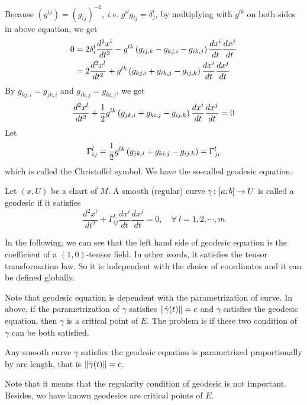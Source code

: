 Because $(g^{ij}) = (g_{ij})^{-1}$, \emph{i.e.} $g^{il}g_{lj} = \delta^i_j$, by multiplying with $g^{lk}$ on both sides in above equation, we get
\begin{equation*}
	\begin{aligned}
		0 &= 2\delta_i^l\frac{d^2x^i}{dt^2} - g^{lk}\left(g_{ij,k}-g_{kj,i}-g_{ik,j}\right)\frac{dx^i}{dt}\frac{dx^j}{dt} \\
		&=2\frac{d^2x^l}{dt^2}+g^{lk}\left(g_{kj,i} + g_{ik,j} - g_{ij,k}\right)\frac{dx^i}{dt}\frac{dx^j}{dt}
	\end{aligned}
\end{equation*}
By $g_{kj,i} = g_{jk,i}$ and $g_{ik,j} = g_{ki,j}$, we get
\begin{equation*}
	\frac{d^2x^l}{dt^2}+\frac{1}{2}g^{lk}\left(g_{jk,i} + g_{ki,j} - g_{ij,k}\right)\frac{dx^i}{dt}\frac{dx^j}{dt} = 0
\end{equation*}
Let
\begin{equation*}
	\Gamma_{ij}^l = \frac{1}{2}g^{lk}\left(g_{jk,i} + g_{ki,j} - g_{ij,k}\right) = \Gamma_{ji}^l
\end{equation*}
which is called the Christoffel symbol. We have the so-called geodesic equation.
\begin{defn}
	Let $(x,U)$ be a chart of $M$. A smooth (regular) curve $\gamma \colon [a,b] \rightarrow U$ is called a geodesic if it satisfies
	\begin{equation}\label{eq:geodesic}
		\frac{d^2x^l}{dt^2}+\Gamma_{ij}^l\frac{dx^i}{dt}\frac{dx^j}{dt} = 0,\quad \forall~l=1,2,\cdots,m
	\end{equation}
\end{defn}
\begin{rmk}
	In the following, we can see that the left hand side of geodesic equation is the coefficient of a $(1,0)$-tensor field. In other words, it satisfies the tensor transformation law. So it is independent with the choice of coordinates and it can be defined globally.
\end{rmk}
Note that geodesic equation is dependent with the parametrization of curve. In above, if the parametrization of $\gamma$ satisfies $\left\lVert\dot{\gamma}(t)\right\lVert = c$ and $\gamma$ satisfies the geodesic equation, then $\gamma$ is a critical point of $E$. The problem is if these two condition of $\gamma$ can be both satisfied.
\begin{lem}
	Any smooth curve $\gamma$ satisfies the geodesic equation is parametrized proportionally by arc length, that is $\left\lVert\dot{\gamma}(t)\right\lVert = c$.
\end{lem}
\begin{rmk}
	Note that it means that the regularity condition of geodesic is not important. Besides, we have known geodesics are critical points of $E$. 
\end{rmk}
